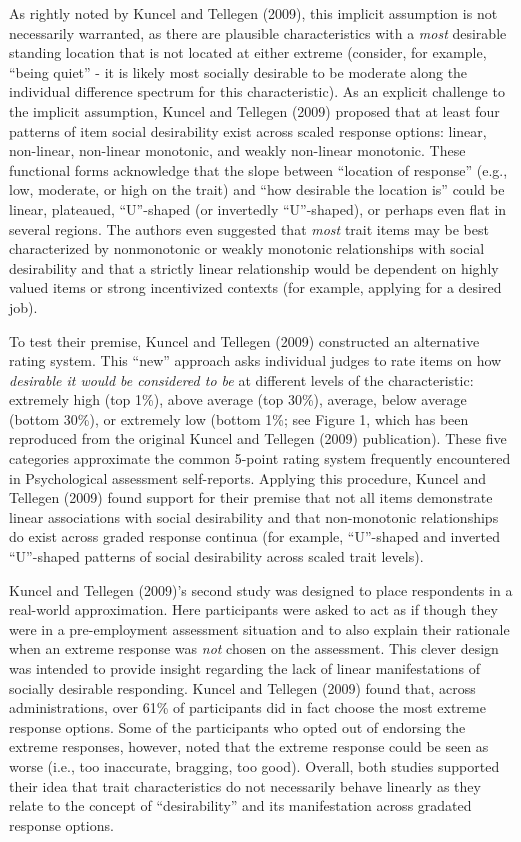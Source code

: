 \documentclass[
  english,
  ,jou]{apa6}
\begin{document}
As rightly noted by Kuncel and Tellegen (2009), this implicit assumption is not necessarily warranted, as there are plausible characteristics with a \emph{most} desirable standing location that is not located at either extreme (consider, for example, \enquote{being quiet} - it is likely most socially desirable to be moderate along the individual difference spectrum for this characteristic). As an explicit challenge to the implicit assumption, Kuncel and Tellegen (2009) proposed that at least four patterns of item social desirability exist across scaled response options: linear, non-linear, non-linear monotonic, and weakly non-linear monotonic. These functional forms acknowledge that the slope between \enquote{location of response} (e.g., low, moderate, or high on the trait) and \enquote{how desirable the location is} could be linear, plateaued, \enquote{U}-shaped (or invertedly \enquote{U}-shaped), or perhaps even flat in several regions. The authors even suggested that \emph{most} trait items may be best characterized by nonmonotonic or weakly monotonic relationships with social desirability and that a strictly linear relationship would be dependent on highly valued items or strong incentivized contexts (for example, applying for a desired job).

To test their premise, Kuncel and Tellegen (2009) constructed an alternative rating system. This \enquote{new} approach asks individual judges to rate items on how \emph{desirable it would be considered to be} at different levels of the characteristic: extremely high (top 1\%), above average (top 30\%), average, below average (bottom 30\%), or extremely low (bottom 1\%; see Figure 1, which has been reproduced from the original Kuncel and Tellegen (2009) publication). These five categories approximate the common 5-point rating system frequently encountered in Psychological assessment self-reports. Applying this procedure, Kuncel and Tellegen (2009) found support for their premise that not all items demonstrate linear associations with social desirability and that non-monotonic relationships do exist across graded response continua (for example, \enquote{U}-shaped and inverted \enquote{U}-shaped patterns of social desirability across scaled trait levels).

Kuncel and Tellegen (2009)'s second study was designed to place respondents in a real-world approximation. Here participants were asked to act as if though they were in a pre-employment assessment situation and to also explain their rationale when an extreme response was \emph{not} chosen on the assessment. This clever design was intended to provide insight regarding the lack of linear manifestations of socially desirable responding. Kuncel and Tellegen (2009) found that, across administrations, over 61\% of participants did in fact choose the most extreme response options. Some of the participants who opted out of endorsing the extreme responses, however, noted that the extreme response could be seen as worse (i.e., too inaccurate, bragging, too good). Overall, both studies supported their idea that trait characteristics do not necessarily behave linearly as they relate to the concept of \enquote{desirability} and its manifestation across gradated response options.
\end{document}
